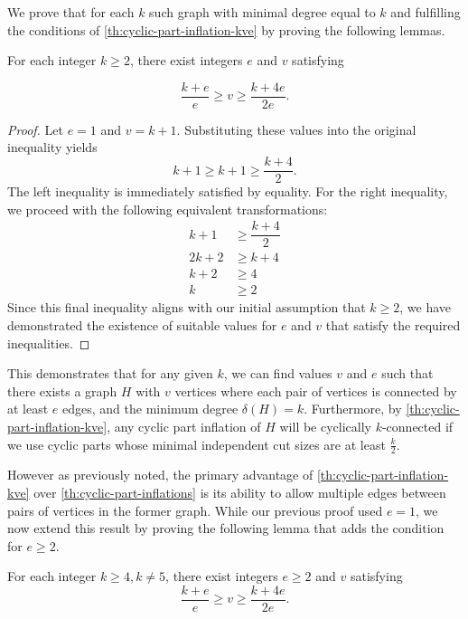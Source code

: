 \documentclass[12pt, twoside]{book}
\begin{document}
We prove that for each $k$ such graph with minimal degree equal to $k$ and fulfilling the conditions of \cref{th:cyclic-part-inflation-kve} by proving the following lemmas.

\begin{lemma}
	For each integer $k\geq 2$, there exist integers $e$ and $v$ satisfying
	
	$$\dfrac{k+e}{e}\geq v\geq \dfrac{k+4e}{2e}.$$
\end{lemma}

\begin{proof}
	Let $e=1$ and $v=k+1$. Substituting these values into the original inequality yields
	$$k+1\geq k+1\geq \dfrac{k+4}{2}.$$
	The left inequality is immediately satisfied by equality. For the right inequality, we proceed with the following equivalent transformations:
	\begin{align*}
		k+1&\geq \dfrac{k+4}{2} \\
		2k+2&\geq k+4 \\
		k+2&\geq 4 \\
		k&\geq 2
	\end{align*}
	Since this final inequality aligns with our initial assumption that $k\geq 2$, we have demonstrated the existence of suitable values for $e$ and $v$ that satisfy the required inequalities.
\end{proof}

This demonstrates that for any given $k$, we can find values $v$ and $e$ such that there exists a graph $H$ with $v$ vertices where each pair of vertices is connected by at least $e$ edges, and the minimum degree $\delta(H)=k$. Furthermore, by \cref{th:cyclic-part-inflation-kve}, any cyclic part inflation of $H$ will be cyclically $k$-connected if we use cyclic parts whose minimal independent cut sizes are at least $\frac{k}{2}$.

However as previously noted, the primary advantage of \cref{th:cyclic-part-inflation-kve} over \cref{th:cyclic-part-inflations} is its ability to allow multiple edges between pairs of vertices in the former graph. While our previous proof used $e=1$, we now extend this result by proving the following lemma that adds the condition for $e\geq 2$.

\begin{lemma}
	For each integer $k\geq 4, k\neq 5$, there exist integers $e\geq 2$ and $v$ satisfying
	$$\dfrac{k+e}{e}\geq v\geq \dfrac{k+4e}{2e}.$$
\end{lemma}
\end{document}
